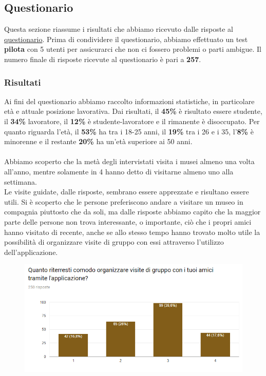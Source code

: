 \def\answers{257}

\subsection{Questionario}

Questa sezione riassume i risultati che abbiamo ricevuto dalle risposte al \href{https://docs.google.com/forms/d/1vKzFGCQb5nvyG6it8HfEqZgZ3ioQ6J1_T6eUiTdYIRc/edit}{questionario}. 
Prima di condividere il questionario, abbiamo effettuato un test \textbf{pilota} con 5 utenti per assicurarci che non ci fossero problemi o parti ambigue. Il numero finale di risposte ricevute al questionario è pari a \textbf{\answers}.

\subsubsection{Risultati}
Ai fini del questionario abbiamo raccolto informazioni statistiche, in particolare età e attuale posizione lavorativa. Dai risultati, il \textbf{45\%} è risultato essere studente, il \textbf{34\%} lavoratore, il \textbf{12\%} è studente-lavoratore e il rimanente è disoccupato. Per quanto riguarda l'età, il \textbf{53\%} ha tra i 18-25 anni, il \textbf{19\%} tra i 26 e i 35, l'\textbf{8\%} è minorenne e il restante \textbf{20\%} ha un'età superiore ai 50 anni.

\paragraph{}
Abbiamo scoperto che la metà degli intervistati visita i musei almeno una volta all'anno, mentre solamente in 4 hanno detto di visitarne almeno uno alla settimana.\\
Le visite guidate, dalle risposte, sembrano essere apprezzate e risultano essere utili. 
Si è scoperto che le persone preferiscono andare a visitare un museo in compagnia piuttosto che da soli, ma dalle risposte abbiamo capito che la maggior parte delle persone non trova interessante, o importante, ciò che i propri amici hanno visitato di recente, anche se allo stesso tempo hanno trovato molto utile la possibilità di organizzare visite di gruppo con essi attraverso l'utilizzo dell'applicazione.

\begin{figure}[ht]
    \centering
    \includegraphics[width=1.0\textwidth]{images/charts-questionario/chart-visite-gruppo.png}
\end{figure}

